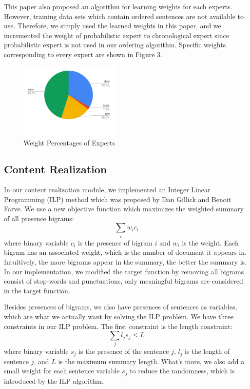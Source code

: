 \documentclass[11pt]{article}
\begin{document}
\indent
This paper also proposed an algorithm for learning weights for each experts. However, training data sets which contain ordered sentences are not available to use. Therefore, we simply used the learned weights in this paper, and we incremented the weight of probabilistic expert to chronological expert since probabilistic expert is not used in our ordering algorithm. Specific weights corresponding to every expert are shown in Figure 3.
\begin{figure}[h]
\begin{center}
\includegraphics[width=0.45\textwidth]{io_pie.png}
\caption{Weight Percentages of Experts}
\end{center}
\end{figure}


\subsection{Content Realization}

In our content realization module, we implemented an Integer Linear Programming (ILP) method which was proposed by Dan Gillick and Benoit Farve. We use a new objective function which maximizes the weighted summary of all presence bigrams:  
\begin{equation}
	\sum_i{w_ic_i}
\end{equation} 
where binary variable $c_i$ is the presence of bigram $i$ and $w_i$ is the weight. Each bigram has an associated weight, which is the number of document it appears in. Intuitively, the more bigrams appear in the summary, the better the summary is. In our implementation, we modified the target function by removing all bigrams consist of stop-words and punctuations, only meaningful bigrams are considered in the target function. 

Besides presences of bigrams, we also have presences of sentences as variables, which are what we actually want by solving the ILP problem. We have three constraints in our ILP problem. The first constraint is the length constraint:
\begin{equation}
	\sum_j{l_js_j} \leq L 
\end{equation} 
where binary variable $s_j$ is the presence of the sentence $j$, $l_j$ is the length of sentence $j$, and $L$ is the maximum summary length. What's more, we also add a small weight for each sentence variable $s_j$ to reduce the randomness, which is introduced by the ILP algorithm. 
\end{document}
